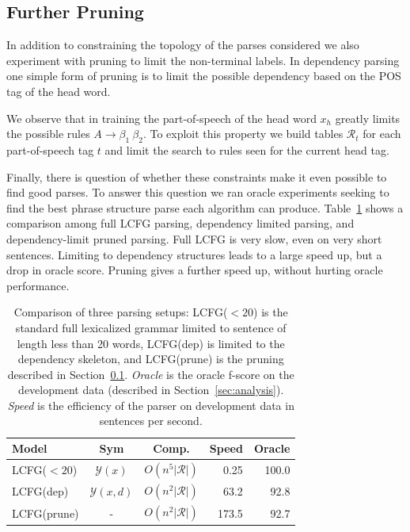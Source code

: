 \documentclass[11pt,letterpaper]{article}
\newcommand{\rules}{\mathcal{R}}
\newcommand{\Rule}[3]{#1 \rightarrow #2\ #3}
\begin{document}
\subsection{Further Pruning}
\label{sec:prune}

In addition to constraining the topology of the parses considered we
also experiment with pruning to limit the non-terminal labels.  In
dependency parsing one simple form of pruning is to limit the possible
dependency based on the POS tag of the head word.

We observe that in training the part-of-speech of the head word $x_h$
greatly limits the possible rules $\Rule{A}{\beta_1}{\beta_2}$.  To
exploit this property we build tables $\rules_t$ for each
part-of-speech tag $t$ and limit the search to rules seen for the
current head tag.

Finally, there is question of whether these constraints make it even
possible to find good parses. To answer this question we ran oracle
experiments seeking to find the best phrase structure parse each
algorithm can produce.  Table~\ref{tab:alg-oracle} shows a comparison
among full LCFG parsing, dependency limited parsing, and
dependency-limit pruned parsing. Full LCFG is very slow, even on very
short sentences.  Limiting to dependency structures leads to a large
speed up, but a drop in oracle score. Pruning gives a further speed up,
without hurting oracle performance.




\begin{table}
  \centering
  \small
  \hspace*{-0.3cm}
  \begin{tabular}{|l|ccrr|}
    \hline
    Model & Sym & Comp. & Speed & Oracle  \\
    \hline
    \hline
    LCFG($< 20$)  & $\mathcal{Y}(x)$ & $O(n^5|\rules|)$ &     0.25 & 100.0  \\
    LCFG(dep)    & $\mathcal{Y}(x,d)$ & $O(n^2|\rules|)$ &  63.2 & 92.8    \\
    LCFG(prune)  &  - & $O(n^2|\rules|)$ &   173.5 & 92.7 \\
    \hline
  \end{tabular}
  \label{tab:alg-oracle}
  \caption{Comparison of three parsing setups:
    LCFG($<20$) is the standard full lexicalized grammar limited to sentence of length
    less than 20 words, LCFG(dep) is
    limited to the dependency skeleton, and LCFG(prune) is the pruning described in
    Section~\ref{sec:prune}. \textit{Oracle} is the oracle f-score on the development data (described in Section~\ref{sec:analysis}). \textit{Speed} is the efficiency of the parser on development data in sentences per second.}
\end{table}
\end{document}
